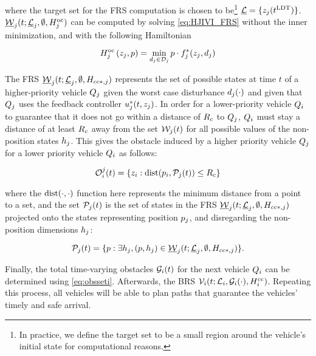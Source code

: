 \noindent where the target set for the FRS computation is chosen to be\footnote{In practice, we define the target set to be a small region around the vehicle's initial state for computational reasons.} $\underline {\mathcal{L}} = \{z_j(t^\text{LDT})\}$. $\underline{\mathcal{W}}_j(t; \underline{\mathcal{L}}_j, \emptyset, H^\text{oc}_j)$ can be computed by solving \eqref{eq:HJIVI_FRS} without the inner minimization, and with the following Hamiltonian

\begin{equation}
H^\text{oc}_j\left(z_j, p\right) = \min_{d_j \in \mathcal{D}_j} p \cdot f^*_j(z_j, d_j)
\end{equation}

The FRS $\underline{\mathcal{W}}_j(t; \underline{\mathcal{L}}_j, \emptyset, H_{cc*,j})$ represents the set of possible states at time $t$ of a higher-priority vehicle $Q_{j}$ given the worst case disturbance $d_j(\cdot)$ and given that $Q_{j}$ uses the feedback controller $u_j^*(t, z_j)$. In order for a lower-priority vehicle $Q_{i}$ to guarantee that it does not go within a distance of $R_c$ to $Q_{j}$, $Q_{i}$ must stay a distance of at least $R_c$ away from the set $\mathcal{W}_j(t)$ for all possible values of the non-position states $h_j$. This gives the obstacle induced by a higher priority vehicle $Q_{j}$ for a lower priority vehicle $Q_{i}$ as follows:

\begin{equation}
\mathcal{O}_i^j(t) = \{z_i: \text{dist}(p_i, \mathcal{P}_j(t)) \le R_c \}
\end{equation}

\noindent where the $\text{dist}(\cdot, \cdot)$ function here represents the minimum distance from a point to a set, and the set $\mathcal{P}_j(t)$ is the set of states in the FRS $\underline{\mathcal{W}}_j(t; \underline{\mathcal{L}}_j, \emptyset, H_{cc*,j})$ projected onto the states representing position $p_j$, and disregarding the non-position dimensions $h_j$:

\begin{equation}
\mathcal{P}_j(t) = \{p: \exists h_j, (p, h_j) \in \underline{\mathcal{W}}_j(t; \underline{\mathcal{L}}_j, \emptyset, H_{cc*,j})\}.
\end{equation}

Finally, the total time-varying obstacles $\mathcal{G}_i(t)$ for the next vehicle $Q_{i}$ can be determined using \eqref{eq:obsseti}. Afterwards, the BRS $\mathcal{V}_i(t; \mathcal{L}_i, \mathcal{G}_i(\cdot), H^\text{cc}_i)$. Repeating this process, all vehicles will be able to plan paths that guarantee the vehicles' timely and safe arrival.

